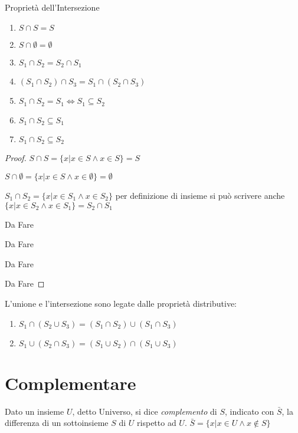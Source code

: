 \begin{prop}
Proprietà dell'Intersezione
\begin{enumerate}
  \item $S \cap S = S$
  \item $S \cap \emptyset = \emptyset$
  \item $S_1 \cap S_2 = S_2 \cap S_1$
  \item $(S_1 \cap S_2) \cap S_3 = S_1 \cap (S_2 \cap S_3)$
  \item $S_1 \cap S_2 = S_1 \iff S_1 \subseteq S_2$
  \item $S_1 \cap S_2 \subseteq S_1$
  \item $S_1 \cap S_2 \subseteq S_2$
\end{enumerate}
\end{prop}

\begin{proof}
    \item $S \cap S = \{ x | x \in S \land x \in S \} = S$
    \item $S \cap \emptyset = \{ x | x \in S \land x \in \emptyset \} = \emptyset$
    \item $S_1 \cap S_2 = \{ x | x \in S_1 \land x \in S_2 \}$ per definizione di insieme
           si può scrivere anche $\{ x | x \in S_2 \land x \in S_1 \} = S_2 \cap S_1 $
    \item Da Fare
    \item Da Fare
    \item Da Fare
    \item Da Fare
\end{proof}

L'unione e l'intersezione sono legate dalle proprietà distributive:

\begin{enumerate}
  \item $S_1 \cap (S_2 \cup S_3) = (S_1 \cap S_2) \cup (S_1 \cap S_3)$
  \item $S_1 \cup (S_2 \cap S_3) = (S_1 \cup S_2) \cap (S_1 \cup S_3)$
\end{enumerate}

\section{Complementare}
Dato un insieme $U$, detto Universo, si dice \textit{complemento} di $S$, indicato con $\bar{S}$,
la differenza di un sottoinsieme $S$ di $U$ rispetto ad $U$.\newline
$\bar{S} = \{x | x \in U \land x \not \in S \} $

